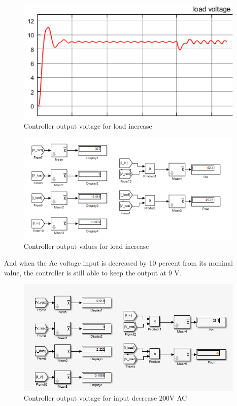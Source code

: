 \documentclass[12pt]{article}
\begin{document}
\begin{figure}[H]
    \centering
    \includegraphics[width=14cm]{d1}
    \caption{Controller output voltage for load increase}
    \label{fig:d1}
\end{figure}

\begin{figure}[H]
    \centering
    \includegraphics[width=14cm]{d2}
    \caption{Controller output values for load increase}
    \label{fig:d2}
\end{figure}

And when the Ac voltage input is decreased by 10 percent from its nominal value, the controller is still able to keep the output at 9 V.

\begin{figure}[H]
    \centering
    \includegraphics[width=14cm]{d3}
    \caption{Controller output voltage for input decrease 200V AC}
    \label{fig:d1}
\end{figure}
\end{document}
